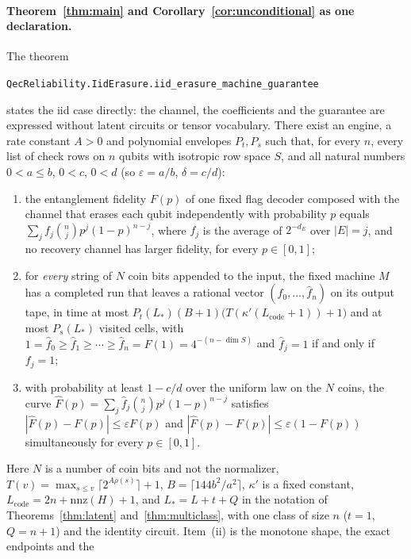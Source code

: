 \documentclass[11pt]{article}
\theoremstyle{remark}
\newcommand{\eps}{\varepsilon}
\newcommand{\Bern}[2]{\binom{#1}{#2}p^{#2}(1-p)^{#1-#2}}
\newcommand{\lean}[1]{\texttt{#1}}
\begin{document}
\paragraph{Theorem~\ref{thm:main} and Corollary~\ref{cor:unconditional}
as one declaration.}
The theorem
\begin{center}
\lean{QecReliability.IidErasure.iid\_erasure\_machine\_guarantee}
\end{center}
states the iid case directly: the channel, the coefficients and the
guarantee are expressed without latent circuits or tensor vocabulary.
There exist an engine, a rate constant \(A>0\) and polynomial envelopes
\(P_t,P_s\) such that, for every \(n\), every list of check rows on \(n\)
qubits with isotropic row space \(S\), and all natural numbers
\(0<a\le b\), \(0<c\), \(0<d\) (so \(\eps=a/b\), \(\delta=c/d\)):
\begin{enumerate}
\item[(i)] the entanglement fidelity \(F(p)\) of one fixed flag decoder
 composed with the channel that erases each qubit independently with
 probability \(p\) equals \(\sum_jf_j\Bern nj\), where \(f_j\) is the
 average of \(2^{-d_E}\) over \(|E|=j\), and no recovery channel has
 larger fidelity, for every \(p\in[0,1]\);
\item[(ii)] for \emph{every} string of \(N\) coin bits appended to the
 input, the fixed machine \(M\) has a completed run that leaves a
 rational vector \((\widehat f_0,\ldots,\widehat f_n)\) on its output
 tape, in time at most \(P_t(L_*)(B+1)\bigl(T(\kappa'(L_{\mathrm{code}}+1))+1\bigr)\)
 and at most \(P_s(L_*)\) visited cells, with
 \(1=\widehat f_0\ge\widehat f_1\ge\cdots\ge\widehat f_n=F(1)=4^{-(n-\dim S)}\)
 and \(\widehat f_j=1\) if and only if \(f_j=1\);
\item[(iii)] with probability at least \(1-c/d\) over the uniform law on
 the \(N\) coins, the curve
 \(\widehat F(p)=\sum_j\widehat f_j\Bern nj\) satisfies
 \(|\widehat F(p)-F(p)|\le\eps F(p)\) and
 \(|\widehat F(p)-F(p)|\le\eps(1-F(p))\) simultaneously for every
 \(p\in[0,1]\).
\end{enumerate}
Here \(N\) is a number of coin bits and not the normalizer,
\(T(v)=\max_{s\le v}\lceil2^{A\rho(s)}\rceil+1\),
\(B=\lceil144b^2/a^2\rceil\), \(\kappa'\) is a fixed constant,
\(L_{\mathrm{code}}=2n+\mathrm{nnz}(H)+1\), and \(L_*=L+t+Q\) in the
notation of Theorems~\ref{thm:latent} and~\ref{thm:multiclass}, with one
class of size \(n\) (\(t=1\), \(Q=n+1\)) and the identity circuit.
Item~(ii) is the monotone shape, the exact endpoints and the
\end{document}

